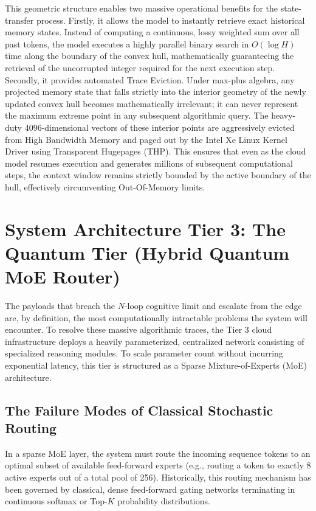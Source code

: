 \documentclass[11pt,a4paper]{article}
\begin{document}
This geometric structure enables two massive operational benefits for the state-transfer process. Firstly, it allows the model to instantly retrieve exact historical memory states. Instead of computing a continuous, lossy weighted sum over all past tokens, the model executes a highly parallel binary search in $O(\log H)$ time along the boundary of the convex hull, mathematically guaranteeing the retrieval of the uncorrupted integer required for the next execution step. Secondly, it provides automated Trace Eviction. Under max-plus algebra, any projected memory state that falls strictly into the interior geometry of the newly updated convex hull becomes mathematically irrelevant; it can never represent the maximum extreme point in any subsequent algorithmic query. The heavy-duty 4096-dimensional vectors of these interior points are aggressively evicted from High Bandwidth Memory and paged out by the Intel Xe Linux Kernel Driver using Transparent Hugepages (THP). This ensures that even as the cloud model resumes execution and generates millions of subsequent computational steps, the context window remains strictly bounded by the active boundary of the hull, effectively circumventing Out-Of-Memory limits.

\section{System Architecture Tier 3: The Quantum Tier (Hybrid Quantum MoE Router)}

The payloads that breach the $N$-loop cognitive limit and escalate from the edge are, by definition, the most computationally intractable problems the system will encounter. To resolve these massive algorithmic traces, the Tier 3 cloud infrastructure deploys a heavily parameterized, centralized network consisting of specialized reasoning modules. To scale parameter count without incurring exponential latency, this tier is structured as a Sparse Mixture-of-Experts (MoE) architecture.

\subsection{The Failure Modes of Classical Stochastic Routing}

In a sparse MoE layer, the system must route the incoming sequence tokens to an optimal subset of available feed-forward experts (e.g., routing a token to exactly 8 active experts out of a total pool of 256). Historically, this routing mechanism has been governed by classical, dense feed-forward gating networks terminating in continuous softmax or Top-$K$ probability distributions.
\end{document}
